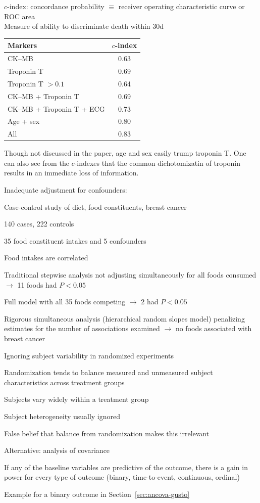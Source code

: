 $c$-index: concordance probability $\equiv$ receiver operating
characteristic curve or ROC area \\ \medskip Measure of
ability to discriminate death within 30d
\begin{center}
\begin{tabular}{lc}
Markers & $c$-index \\ \hline
CK--MB & 0.63 \\
Troponin T & 0.69 \\
Troponin T $> 0.1$ & 0.64 \\
CK--MB + Troponin T & 0.69 \\
CK--MB + Troponin T + ECG & 0.73 \\
Age + sex & 0.80 \\
All & 0.83 \\ \hline
\end{tabular}
\end{center}
\citet{ohm96car}

Though not discussed in the paper, age and sex easily trump troponin
T.  One can also see from the $c$-indexes that the common
dichotomizatin of troponin results in an immediate loss of information.

Inadequate adjustment for confounders: \citet{gre00whe}
\bi
\item Case-control study of diet, food constituents, breast cancer%
\item 140 cases, 222 controls
\item 35 food constituent intakes and 5 confounders
\item Food intakes are correlated
\item Traditional stepwise analysis not adjusting simultaneously
for all foods consumed $\rightarrow$ 11 foods had $P < 0.05$
\item Full model with all 35 foods competing $\rightarrow$ 2 had $P <
0.05$
\item Rigorous simultaneous analysis (hierarchical random slopes
model) penalizing estimates for the number of associations
examined $\rightarrow$ no foods associated with breast cancer
\ei

Ignoring subject variability in randomized experiments
\bi
\item Randomization tends to balance measured and unmeasured subject
characteristics across treatment groups
\item Subjects vary widely within a treatment group
\item Subject heterogeneity usually ignored
\item False belief that balance from randomization makes this
irrelevant
\item Alternative: analysis of covariance
\item If any of the baseline variables are predictive of the outcome,
  there is a gain in power for every type of outcome (binary,
  time-to-event, continuous, ordinal)
\item Example for a binary outcome in Section~\ref{sec:ancova-gusto}
\ei

